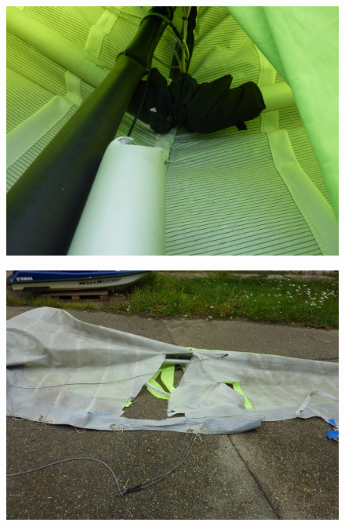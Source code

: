 \documentclass[a4paper,10pt]{article}
\begin{document}
\begin{figure}[ht!]
\centering
\includegraphics[width=13cm]{kepek/KJ5}
\end{figure}
\begin{figure}[ht!]
\centering
\includegraphics[width=13cm]{kepek/KJ6}
\end{figure}


%
% 
\end{document}
